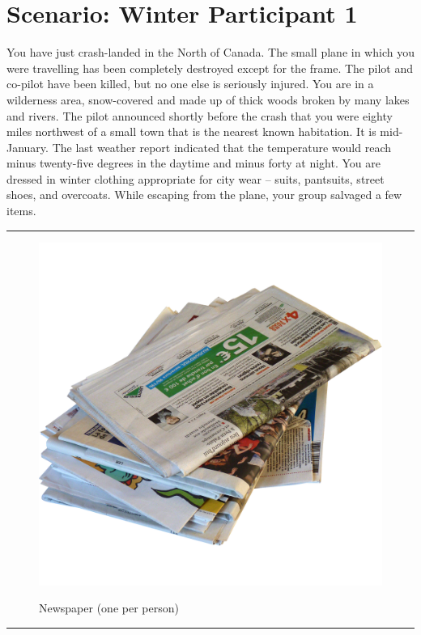 \documentclass{article}
\begin{document}
    \section*{Scenario: \textmd{Winter} \hfill Participant \textmd{1}}
    \Large You have just crash-landed in the North of Canada. The small plane in which you were travelling has been completely destroyed except for the frame. The pilot and co-pilot have been killed, but no one else is seriously injured.
You are in a wilderness area, snow-covered and made up of thick woods broken by many lakes and rivers. The pilot announced shortly before the crash that you were eighty miles northwest of a small town that is the nearest known habitation. It is mid-January. The last weather report indicated that the temperature would reach minus twenty-five degrees in the daytime and minus forty at night. You are dressed in winter clothing appropriate for city wear – suits, pantsuits, street shoes, and overcoats. While escaping from the plane, your group salvaged a few items.
\clearpage
        \par\noindent\rule{\textwidth}{0.4pt}
    \begin{figure}[H]
        \centering
        \begin{minipage}{0.25\textwidth}
            \centering
            \includegraphics[width=\textwidth]{../SurvivalItemImages/newspaper}
        \end{minipage}\hfill
        \begin{minipage}{0.7\textwidth}
            \centering
            \Large Newspaper (one per person)
        \end{minipage}
    \end{figure}
    \vspace{-0.8em}
    \noindent\rule{\textwidth}{0.4pt}
            
\end{document}
